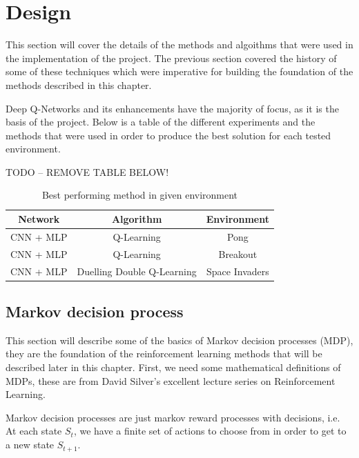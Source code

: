 \chapter{Design}
This section will cover the details of the methods and algoithms that were used in the implementation of the project. The previous section covered the history of some of these techniques which were imperative for building the foundation of the methods described in this chapter.

Deep Q-Networks and its enhancements have the majority of focus, as it is the basis of the project. Below is a table of the different experiments and the methods that were used in order to produce the best solution for each tested environment.

TODO -- REMOVE TABLE BELOW!
\begin{table}[ht!]
	\begin{center}
		\begin{tabular}{|c|c|c|}
			\hline
			Network   & Algorithm                  & Environment    \\
			\hline
			CNN + MLP & Q-Learning                 & Pong           \\
			CNN + MLP & Q-Learning                 & Breakout       \\
			CNN + MLP & Duelling Double Q-Learning & Space Invaders \\
			\hline
		\end{tabular}
		\caption{Best performing method in given environment}\label{table:design:algo-experiment}
	\end{center}
\end{table}

\section{Markov decision process}
\label{dsgn:sec:mdp}
This section will describe some of the basics of Markov decision processes (MDP), they are the foundation of the reinforcement learning methods that will be described later in this chapter. First, we need some mathematical definitions of MDPs, these are from David Silver's excellent lecture series on Reinforcement Learning.

Markov decision processes are just markov reward processes with decisions, i.e. At each state $S_t$, we have a finite set of actions to choose from in order to get to a new state $S_{t+1}$.

